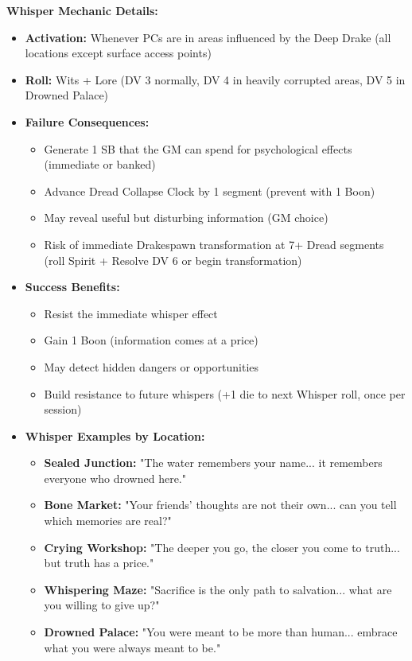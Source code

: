 \documentclass[11pt]{article}
\begin{document}
\textbf{Whisper Mechanic Details:}
\begin{itemize}
\item \textbf{Activation:} Whenever PCs are in areas influenced by the Deep Drake (all locations except surface access points)
\item \textbf{Roll:} Wits + Lore (DV 3 normally, DV 4 in heavily corrupted areas, DV 5 in Drowned Palace)
\item \textbf{Failure Consequences:}
  \begin{itemize}
  \item Generate 1 SB that the GM can spend for psychological effects (immediate or banked)
  \item Advance Dread Collapse Clock by 1 segment (prevent with 1 Boon)
  \item May reveal useful but disturbing information (GM choice)
  \item Risk of immediate Drakespawn transformation at 7+ Dread segments (roll Spirit + Resolve DV 6 or begin transformation)
  \end{itemize}
\item \textbf{Success Benefits:}
  \begin{itemize}
  \item Resist the immediate whisper effect
  \item Gain 1 Boon (information comes at a price)
  \item May detect hidden dangers or opportunities
  \item Build resistance to future whispers (+1 die to next Whisper roll, once per session)
  \end{itemize}
\item \textbf{Whisper Examples by Location:}
  \begin{itemize}
  \item \textbf{Sealed Junction:} "The water remembers your name... it remembers everyone who drowned here."
  \item \textbf{Bone Market:} "Your friends' thoughts are not their own... can you tell which memories are real?"
  \item \textbf{Crying Workshop:} "The deeper you go, the closer you come to truth... but truth has a price."
  \item \textbf{Whispering Maze:} "Sacrifice is the only path to salvation... what are you willing to give up?"
  \item \textbf{Drowned Palace:} "You were meant to be more than human... embrace what you were always meant to be."
  \end{itemize}
\end{itemize}
\end{document}
